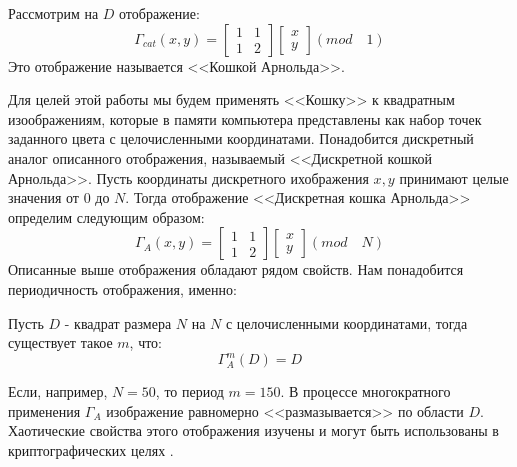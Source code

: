 Рассмотрим на $D$ отображение:
$$\Gamma_{cat}(x,y) = \begin{bmatrix} 1 & 1 \\ 1 & 2 \end{bmatrix}\begin{bmatrix} x \\ y \end{bmatrix} (mod \quad 1)$$
Это отображение называется <<Кошкой Арнольда>>. 

Для целей этой работы мы будем применять <<Кошку>> к квадратным изоображениям, которые в памяти компьютера представлены как набор точек заданного цвета с целочисленными координатами. Понадобится дискретный аналог описанного отображения, называемый <<Дискретной кошкой Арнольда>>.
Пусть координаты дискретного ихображения $x,y$ принимают целые значения от $0$ до $N$. Тогда отображение <<Дискретная кошка Арнольда>> определим следующим образом:
$$\Gamma_{A}(x,y) = \begin{bmatrix} 1 & 1 \\ 1 & 2 \end{bmatrix}\begin{bmatrix} x \\ y \end{bmatrix} (mod \quad N)$$
Описанные выше отображения обладают рядом свойств. Нам понадобится периодичность отображения, именно:
\begin{myproperty}Пусть $D$ - квадрат размера $N$ на $N$ с целочисленными координатами, тогда существует такое $m$, что:
$$\Gamma_{A}^{m}(D) = D$$
\end{myproperty}
Если, например, $N = 50$, то период $m = 150$.
В процессе многократного применения $\Gamma_{A}$ изображение равномерно <<размазывается>> по области $D$. Хаотические свойства этого отображения изучены и могут быть использованы в криптографических целях \autocite{cat}.